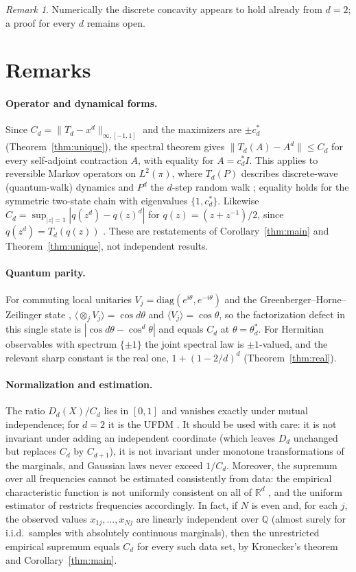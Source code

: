 \documentclass[11pt]{article}
\theoremstyle{definition}\newtheorem{definition}[theorem]{Definition}
\theoremstyle{remark}\newtheorem{remark}[theorem]{Remark}
\begin{document}
\begin{remark}
Numerically the discrete concavity appears to hold already from $d=2$; a proof for every $d$ remains open.
\end{remark}

\section{Remarks}
\paragraph{Operator and dynamical forms.} Since $C_d=\|T_d-x^d\|_{\infty,[-1,1]}$ and the maximizers are $\pm c_d^*$
(Theorem~\ref{thm:unique}), the spectral theorem gives $\|T_d(A)-A^d\|\le C_d$ for every self-adjoint contraction $A$,
with equality for $A=c_d^*I$. This applies to reversible Markov operators on $L^2(\pi)$, where $T_d(P)$ describes
discrete-wave (quantum-walk) dynamics and $P^d$ the $d$-step random walk \cite{AM2024}; equality holds for the symmetric
two-state chain with eigenvalues $\{1,c_d^*\}$. Likewise $C_d=\sup_{|z|=1}|q(z^d)-q(z)^d|$ for $q(z)=(z+z^{-1})/2$, since
$q(z^d)=T_d(q(z))$ \cite{Rivlin1990}. These are restatements of Corollary~\ref{thm:main} and Theorem~\ref{thm:unique}, not
independent results.

\paragraph{Quantum parity.} For commuting local unitaries $V_j=\mathrm{diag}(e^{i\theta},e^{-i\theta})$ and the
Greenberger--Horne--Zeilinger state \cite{Mermin1990}, $\langle\otimes_jV_j\rangle=\cos d\theta$ and
$\langle V_j\rangle=\cos\theta$, so the factorization defect in this single state is $|\cos d\theta-\cos^d\theta|$ and equals
$C_d$ at $\theta=\theta_d^*$. For Hermitian observables with spectrum $\{\pm1\}$ the joint spectral law is
$\pm1$-valued, and the relevant sharp constant is the real one, $1+(1-2/d)^d$ (Theorem~\ref{thm:real}).

\paragraph{Normalization and estimation.} The ratio $D_d(X)/C_d$ lies in $[0,1]$ and vanishes exactly under mutual
independence; for $d=2$ it is the UFDM \cite{Daniusis2025}. It should be used with care: it is not invariant under
adding an independent coordinate (which leaves $D_d$ unchanged but replaces $C_d$ by $C_{d+1}$), it is not invariant under
monotone transformations of the marginals, and Gaussian laws never exceed $1/C_d$. Moreover, the supremum over all
frequencies cannot be estimated consistently from data: the empirical characteristic function is not uniformly
consistent on all of $\mathbb R^d$ \cite{Csorgo1981,CsorgoTotik1983}, and the uniform estimator of \cite{Daniusis2025}
restricts frequencies accordingly. In fact, if $N$ is even and, for each $j$, the observed values $x_{1j},\dots,x_{Nj}$
are linearly independent over $\mathbb Q$ (almost surely for i.i.d.\ samples with absolutely continuous marginals), then
the unrestricted empirical supremum equals $C_d$ for every such data set, by Kronecker's theorem and
Corollary~\ref{thm:main}.
\end{document}
